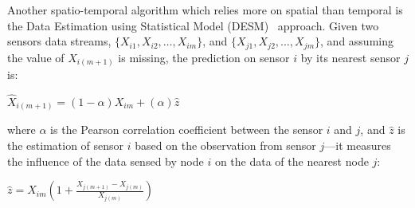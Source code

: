 Another spatio-temporal algorithm which relies more on spatial than temporal is the Data Estimation using Statistical Model (DESM)~\cite{li2008data} approach.  
Given two sensors data streams, $\{X_{i1},X_{i2},\dots,X_{im}\}$, and $\{X_{j1},X_{j2},\dots,X_{jm}\}$, and assuming
the value of $X_{i(m+1)}$ is missing,
the prediction on sensor $i$ by its nearest sensor $j$ is:
\begin{center}
$\hat{X}_{i(m+1)} = (1-\alpha)X_{im} + (\alpha)\hat{z}$
\end{center}
where $\alpha$ is the Pearson correlation coefficient between the sensor $i$ and $j$, and $\hat{z}$ is the estimation of sensor $i$ 
based on the observation from sensor $j$---it measures the influence of the data sensed by node $i$ on the data of 
the nearest node $j$:
\begin{center}
$\hat{z} = X_{im}(1+\frac{X_{j(m+1)}-X_{j(m)}}{X_{j(m)}})$
\end{center}

